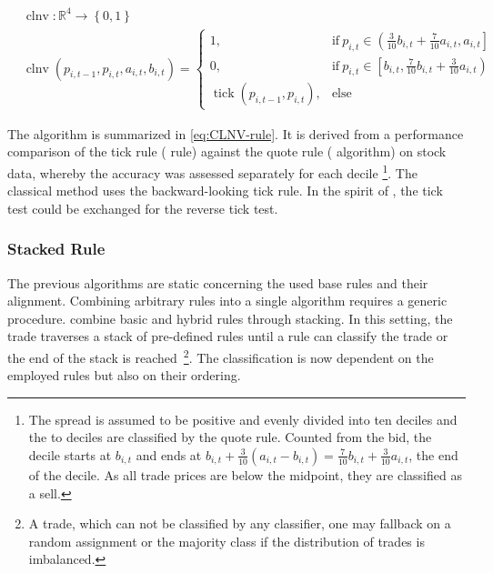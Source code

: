 \begin{equation}
  \begin{aligned}
  &\operatorname{clnv} \colon \mathbb{R}^4 \to \left\{0, 1 \right\}\\
  &\operatorname{clnv}(p_{i, t-1}, p_{i, t}, a_{i, t}, b_{i, t})=
  \begin{cases}
    1,                     & \text{if}\ p_{i, t} \in \left(\frac{3}{10} b_{i,t} + \frac{7}{10} a_{i,t}, a_{i, t}\right] \\
    0,                     & \text{if}\ p_{i, t} \in \left[ b_{i,t}, \frac{7}{10} b_{i,t} + \frac{3}{10} a_{i,t}\right) \\
    \operatorname{tick}(p_{i, t-1}, p_{i, t}), & \text{else}
  \end{cases}
  \end{aligned}
  \label{eq:CLNV-rule}
\end{equation}

The algorithm is summarized in \cref{eq:CLNV-rule}. It is derived from a performance comparison of the tick rule ( rule) against the quote rule ( algorithm) on stock data, whereby the accuracy was assessed separately for each decile \footnote{The spread is assumed to be positive and evenly divided into ten deciles and the  to  deciles are classified by the quote rule. Counted from the bid, the  decile starts at $b_{i,t}$ and ends at $b_{i,t} + \tfrac{3}{10} (a_{i,t} - b_{i,t}) = \tfrac{7}{10} b_{i,t} + \tfrac{3}{10} a_{i,t}$, the end of the  decile. As all trade prices are below the midpoint, they are classified as a sell.}. The classical  method uses the backward-looking tick rule. In the spirit of \textcite[][735]{leeInferringTradeDirection1991}, the tick test could be exchanged for the reverse tick test.

\subsubsection{Stacked Rule}\label{sec:stacked-rule}

The previous algorithms are static concerning the used base rules and their alignment. Combining arbitrary rules into a single algorithm requires a generic procedure. \textcite[][18]{grauerOptionTradeClassification2022} combine basic and hybrid rules through stacking. In this setting, the trade traverses a stack of pre-defined rules until a rule can classify the trade or the end of the stack is reached~\footnote{A trade, which can not be classified by any classifier, one may fallback on a random assignment or the majority class if the distribution of trades is imbalanced.}. The classification is now dependent on the employed rules but also on their ordering.

